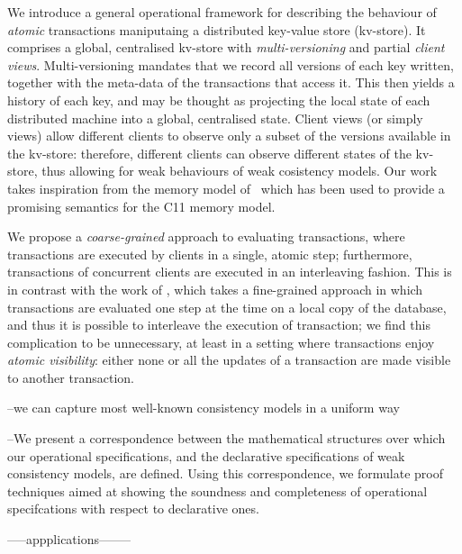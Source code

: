


We introduce a general operational framework for describing the
behaviour of   {\em atomic}
  transactions maniputaing a distributed key-value store
(kv-store). It comprises a global, centralised kv-store with {\em
  multi-versioning} and  partial {\em client views}.  Multi-versioning
mandates that we record all versions of each key written, together
with the meta-data of the transactions that access it. This then
yields a history of each key, and may be thought as projecting the
local state of each distributed machine into a global, centralised
state. Client views (or simply views) allow different clients to
observe only a subset of the versions available in the kv-store:
therefore, different clients can observe different states of the
kv-store, thus allowing for weak behaviours of weak cosistency
models. Our work takes inspiration from the memory model
of~\cite{viktor'spromises} which has been used to provide a promising
semantics for the C11 memory model.





We propose a \emph{coarse-grained} approach to evaluating transactions, 
where transactions are executed by clients in a single, atomic step; furthermore, 
transactions of concurrent clients are executed in an interleaving fashion.
This is in contrast with the work of \cite{alonetogether}, which 
takes a fine-grained approach in which transactions are evaluated one step 
at the time on a local copy of the database, and thus it is possible 
to interleave the execution of transaction; we find this complication to be 
unnecessary, at least in a setting where transactions enjoy \emph{atomic 
visibility}: either none or all the updates of a transaction are made 
visible to another transaction. 

--we can capture most well-known  consistency models in a uniform way

--We present a correspondence between the mathematical structures 
over which our operational specifications, and the declarative
specifications of weak consistency models, are defined. Using 
this correspondence, we formulate proof techniques aimed 
at showing the soundness and completeness of operational specifcations 
with respect to declarative ones.


-----appplications--------

